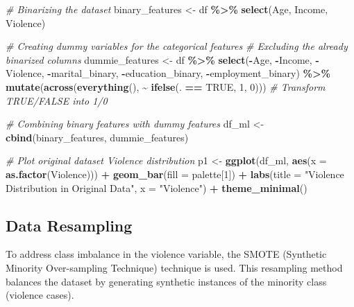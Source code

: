 \documentclass[
]{article}
\newenvironment{Shaded}{\begin{snugshade}}{\end{snugshade}}
\newcommand{\AttributeTok}[1]{\textcolor[rgb]{0.13,0.29,0.53}{#1}}
\newcommand{\CommentTok}[1]{\textcolor[rgb]{0.56,0.35,0.01}{\textit{#1}}}
\newcommand{\ConstantTok}[1]{\textcolor[rgb]{0.56,0.35,0.01}{#1}}
\newcommand{\DecValTok}[1]{\textcolor[rgb]{0.00,0.00,0.81}{#1}}
\newcommand{\FunctionTok}[1]{\textcolor[rgb]{0.13,0.29,0.53}{\textbf{#1}}}
\newcommand{\NormalTok}[1]{#1}
\newcommand{\OtherTok}[1]{\textcolor[rgb]{0.56,0.35,0.01}{#1}}
\newcommand{\SpecialCharTok}[1]{\textcolor[rgb]{0.81,0.36,0.00}{\textbf{#1}}}
\newcommand{\StringTok}[1]{\textcolor[rgb]{0.31,0.60,0.02}{#1}}
\begin{document}
\begin{Shaded}
\begin{Highlighting}[]
\CommentTok{\# Binarizing the dataset}
\NormalTok{binary\_features }\OtherTok{\textless{}{-}}\NormalTok{ df }\SpecialCharTok{\%\textgreater{}\%} \FunctionTok{select}\NormalTok{(Age, Income, Violence)}

\CommentTok{\# Creating dummy variables for the categorical features}
\CommentTok{\# Excluding the already binarized columns}
\NormalTok{dummie\_features }\OtherTok{\textless{}{-}}\NormalTok{ df }\SpecialCharTok{\%\textgreater{}\%} 
  \FunctionTok{select}\NormalTok{(}\SpecialCharTok{{-}}\NormalTok{Age, }\SpecialCharTok{{-}}\NormalTok{Income, }\SpecialCharTok{{-}}\NormalTok{Violence, }\SpecialCharTok{{-}}\NormalTok{marital\_binary, }\SpecialCharTok{{-}}\NormalTok{education\_binary, }\SpecialCharTok{{-}}\NormalTok{employment\_binary) }\SpecialCharTok{\%\textgreater{}\%}
  \FunctionTok{mutate}\NormalTok{(}\FunctionTok{across}\NormalTok{(}\FunctionTok{everything}\NormalTok{(), }\SpecialCharTok{\textasciitilde{}} \FunctionTok{ifelse}\NormalTok{(. }\SpecialCharTok{==} \ConstantTok{TRUE}\NormalTok{, }\DecValTok{1}\NormalTok{, }\DecValTok{0}\NormalTok{)))  }\CommentTok{\# Transform TRUE/FALSE into 1/0}

\CommentTok{\# Combining binary features with dummy features}
\NormalTok{df\_ml }\OtherTok{\textless{}{-}} \FunctionTok{cbind}\NormalTok{(binary\_features, dummie\_features)}

\CommentTok{\# Plot original dataset Violence distribution}
\NormalTok{p1 }\OtherTok{\textless{}{-}} \FunctionTok{ggplot}\NormalTok{(df\_ml, }\FunctionTok{aes}\NormalTok{(}\AttributeTok{x =} \FunctionTok{as.factor}\NormalTok{(Violence))) }\SpecialCharTok{+}
  \FunctionTok{geom\_bar}\NormalTok{(}\AttributeTok{fill =}\NormalTok{ palette[}\DecValTok{1}\NormalTok{]) }\SpecialCharTok{+}
  \FunctionTok{labs}\NormalTok{(}\AttributeTok{title =} \StringTok{"Violence Distribution in Original Data"}\NormalTok{, }\AttributeTok{x =} \StringTok{"Violence"}\NormalTok{) }\SpecialCharTok{+}
  \FunctionTok{theme\_minimal}\NormalTok{()}
\end{Highlighting}
\end{Shaded}

\hypertarget{data-resampling}{%
\subsection{Data Resampling}\label{data-resampling}}

To address class imbalance in the violence variable, the SMOTE
(Synthetic Minority Over-sampling Technique) technique is used. This
resampling method balances the dataset by generating synthetic instances
of the minority class (violence cases).
\end{document}
